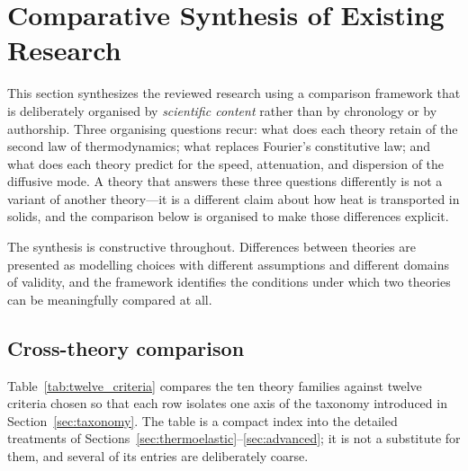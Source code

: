 \section{Comparative Synthesis of Existing Research}
\label{sec:comparative}

This section synthesizes the reviewed research using a comparison framework that is deliberately organised by \emph{scientific content} rather than by chronology or by authorship. Three organising questions recur: what does each theory retain of the second law of thermodynamics; what replaces Fourier's constitutive law; and what does each theory predict for the speed, attenuation, and dispersion of the diffusive mode. A theory that answers these three questions differently is not a variant of another theory---it is a different claim about how heat is transported in solids, and the comparison below is organised to make those differences explicit.

The synthesis is constructive throughout. Differences between theories are presented as modelling choices with different assumptions and different domains of validity, and the framework identifies the conditions under which two theories can be meaningfully compared at all.

\subsection{Cross-theory comparison}
\label{sec:12.1}

Table~\ref{tab:twelve_criteria} compares the ten theory families against twelve criteria chosen so that each row isolates one axis of the taxonomy introduced in Section~\ref{sec:taxonomy}. The table is a compact index into the detailed treatments of Sections~\ref{sec:thermoelastic}--\ref{sec:advanced}; it is not a substitute for them, and several of its entries are deliberately coarse.

